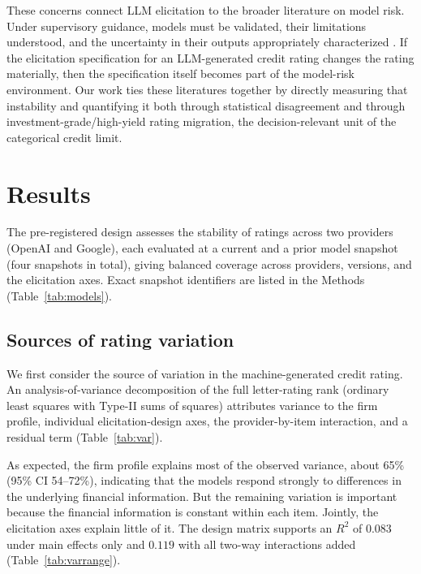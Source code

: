 \documentclass[a4paper,fleqn]{cas-sc}
\begin{document}
These concerns connect LLM elicitation to the broader literature on model risk. Under supervisory
guidance, models must be validated, their limitations understood, and the uncertainty in their outputs
appropriately characterized \citep{srletter2011}. If the elicitation specification for an LLM-generated
credit rating changes the rating materially, then the specification itself becomes part of the model-risk
environment. Our work ties these literatures together by directly measuring that instability and
quantifying it both through statistical disagreement and through investment-grade/high-yield rating
migration, the decision-relevant unit of the categorical credit limit.

\section{Results}\label{sec:results}
The pre-registered design assesses the stability of ratings across two providers (OpenAI and Google),
each evaluated at a current and a prior model snapshot (four snapshots in total), giving balanced
coverage across providers, versions, and the elicitation axes. Exact snapshot identifiers are listed in
the Methods (Table~\ref{tab:models}).

\subsection{Sources of rating variation}
We first consider the source of variation in the machine-generated credit rating. An
analysis-of-variance decomposition of the full letter-rating rank (ordinary least squares with Type-II
sums of squares) attributes variance to the firm profile, individual elicitation-design axes, the
provider-by-item interaction, and a residual term (Table~\ref{tab:var}).

As expected, the firm profile explains most of the observed variance, about 65\% (95\% CI 54--72\%),
indicating that the models respond strongly to differences in the underlying financial information. But
the remaining variation is important because the financial information is constant within each item. Jointly, the elicitation axes explain little of it. The design matrix supports an $R^2$ of $0.083$ under main effects only and $0.119$ with
all two-way interactions added (Table~\ref{tab:varrange}).
\end{document}
